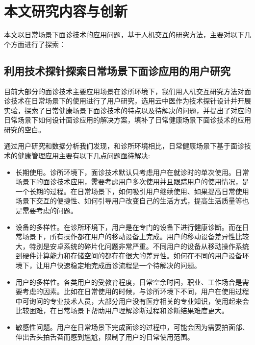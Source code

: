 \section{本文研究内容与创新}

本文以日常场景下面诊技术的应用问题，基于人机交互的研究方法，主要对以下几个方面进行了探索：

\subsection{利用技术探针探索日常场景下面诊应用的用户研究}

目前大部分的面诊技术主要应用场景在诊所环境下，我们用人机交互研究方法对面诊技术在日常场景下的使用进行了用户研究，选用云中医作为技术探针设计并开展实验，探索了日常健康场景下面诊技术的特点以及待解决的问题，并提出了对应的日常场景下如何设计面诊应用的解决方案，填补了日常健康场景下面诊技术的应用研究的空白\cite{ding2019reading}。

通过用户研究和数据分析我们发现，和诊所环境相比，日常健康场景下基于面诊技术的健康管理应用主要有以下几点问题亟待解决: 

\begin{itemize}
    
    \item 长期使用。诊所环境下，面诊技术默认只考虑用户在就诊时的单次使用。日常场景下的面诊技术应用，需要考虑用户多次使用并且跟踪用户的使用情况，是一个长期的过程。在日常场景下，如何吸引用户继续使用、如果提高日常使用场景下交互的便捷性、如何引导用户改变自己的生活方式，提高生活质量等也是需要考虑的问题。

    \item 设备的多样性。在诊所环境下，用户是在专门的设备下进行健康诊断。而在日常场景下，所有操作都在用户的移动设备上完成。用户的移动设备差异性比较大，特别是安卓系统的碎片化问题非常严重。不同用户的设备从移动操作系统到硬件计算能力和存储空间的都存在很大的差异性。如何在不同的用户设备环境下，让用户快速稳定地完成面诊流程是一个待解决的问题。
    
    \item 用户的多样性。各类用户的受教育程度，日常空余时间，职业、工作场合是需要考虑的因素。比如在日常使用的时候，与诊所环境下不同，用户在使用过程中可询问的专业技术人员，大部分用户没有医疗相关的专业知识，使用起来会比较困难，在日常场景下帮助用户理解诊断过程和诊断结果难度更大。
    
    \item 敏感性问题。用户在日常场景下完成面诊的过程中，可能会因为需要拍面部、伸出舌头拍舌苔而感到尴尬，限制了用户的日常使用范围。

\end{itemize}

